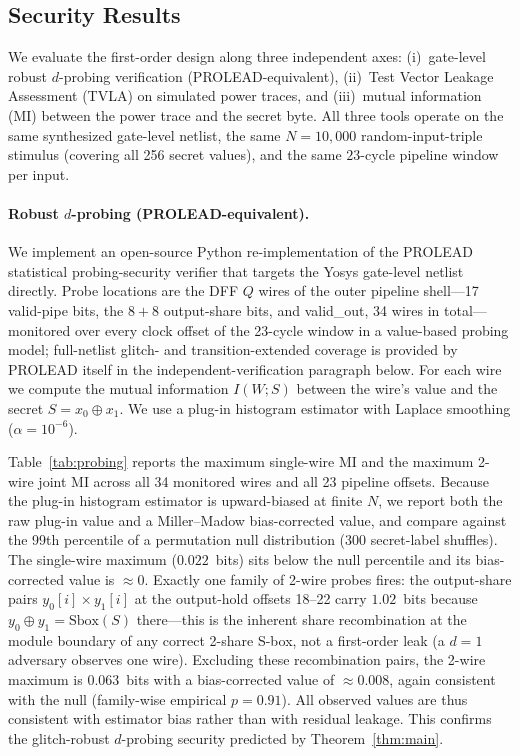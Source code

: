 \documentclass[lettersize,journal]{IEEEtran}
\begin{document}
\subsection{Security Results}
\label{sec:results}

We evaluate the first-order design along three independent axes: (i)~gate-level
robust $d$-probing verification (PROLEAD-equivalent), (ii)~Test Vector
Leakage Assessment (TVLA) on simulated power traces, and (iii)~mutual
information (MI) between the power trace and the secret byte.  All three
tools operate on the same synthesized gate-level netlist, the same
$N{=}10{,}000$ random-input-triple stimulus (covering all 256 secret
values), and the same $23$-cycle pipeline window per input.

\paragraph{Robust $d$-probing (PROLEAD-equivalent).}
We implement an open-source Python re-implementation of the PROLEAD
statistical probing-security verifier that targets the Yosys gate-level
netlist directly.  Probe locations are the DFF $Q$ wires of the outer
pipeline shell---17 valid-pipe bits, the $8{+}8$ output-share bits, and
valid\_out, 34 wires in total---monitored over every clock offset of the
23-cycle window in a value-based probing model; full-netlist glitch-
and transition-extended coverage is provided by PROLEAD itself in the
independent-verification paragraph below.  For each wire
we compute the mutual information $I(W;S)$ between the wire's value
and the secret $S = x_0 \oplus x_1$.  We use a plug-in
histogram estimator with Laplace smoothing ($\alpha = 10^{-6}$).

Table~\ref{tab:probing} reports the maximum single-wire MI and the
maximum 2-wire joint MI
across all 34 monitored wires and all 23 pipeline offsets.  Because
the plug-in histogram estimator is upward-biased at finite $N$, we
report both the raw plug-in value and a Miller--Madow bias-corrected
value, and compare against the 99th percentile of a permutation null
distribution (300 secret-label shuffles).  The single-wire maximum
($0.022$~bits) sits below the null percentile and its
bias-corrected value is $\approx 0$.  Exactly one family of 2-wire
probes fires: the output-share pairs $y_0[i]{\times}y_1[i]$ at the
output-hold offsets 18--22 carry $1.02$~bits because
$y_0 \oplus y_1 = \mathrm{Sbox}(S)$ there---this is the inherent
share recombination at the module boundary of any correct 2-share
S-box, not a first-order leak (a $d{=}1$ adversary observes one
wire).  Excluding these recombination pairs, the 2-wire maximum is
$0.063$~bits with a bias-corrected value of $\approx 0.008$, again
consistent with the null (family-wise empirical $p = 0.91$).  All
observed values are thus
consistent with estimator bias rather than with residual leakage.
This confirms the glitch-robust $d$-probing security predicted by
Theorem~\ref{thm:main}.
\end{document}
